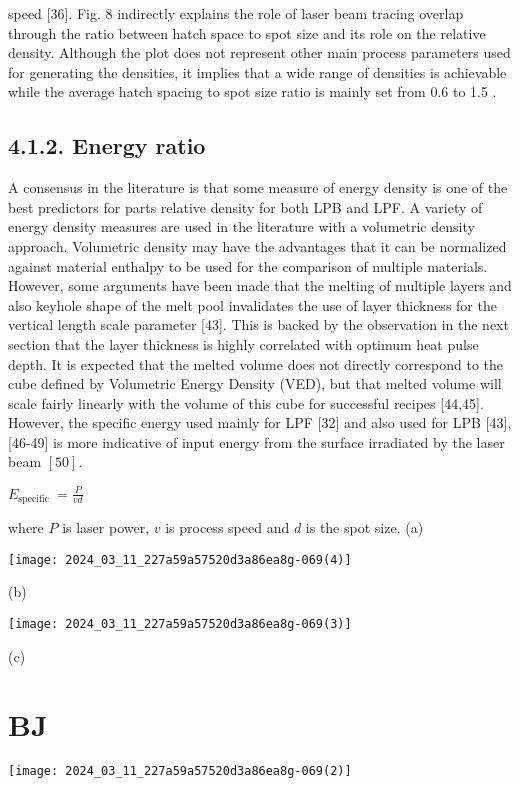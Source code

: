 \documentclass[10pt]{article}
\begin{document}
speed [36]. Fig. 8 indirectly explains the role of laser beam tracing overlap through the ratio between hatch space to spot size and its role on the relative density. Although the plot does not represent other main process parameters used for generating the densities, it implies that a wide range of densities is achievable while the average hatch spacing to spot size ratio is mainly set from 0.6 to 1.5 .

\subsection*{4.1.2. Energy ratio}
A consensus in the literature is that some measure of energy density is one of the best predictors for parts relative density for both LPB and LPF. A variety of energy density measures are used in the literature with a volumetric density approach. Volumetric density may have the advantages that it can be normalized against material enthalpy to be used for the comparison of multiple materials. However, some arguments have been made that the melting of multiple layers and also keyhole shape of the melt pool invalidates the use of layer thickness for the vertical length scale parameter [43]. This is backed by the observation in the next section that the layer thickness is highly correlated with optimum heat pulse depth. It is expected that the melted volume does not directly correspond to the cube defined by Volumetric Energy Density (VED), but that melted volume will scale fairly linearly with the volume of this cube for successful recipes [44,45]. However, the specific energy used mainly for LPF [32] and also used for LPB [43], [46-49] is more indicative of input energy from the surface irradiated by the laser beam $[50]$.

$E_{\text {specific }}=\frac{P}{v d}$

where $P$ is laser power, $v$ is process speed and $d$ is the spot size. (a)

\begin{center}
\texttt{[image: 2024\_03\_11\_227a59a57520d3a86ea8g-069(4)]}
\end{center}

(b)

\begin{center}
\texttt{[image: 2024\_03\_11\_227a59a57520d3a86ea8g-069(3)]}
\end{center}

(c)

\section*{BJ}
\begin{center}
\texttt{[image: 2024\_03\_11\_227a59a57520d3a86ea8g-069(2)]}
\end{center}
\end{document}
